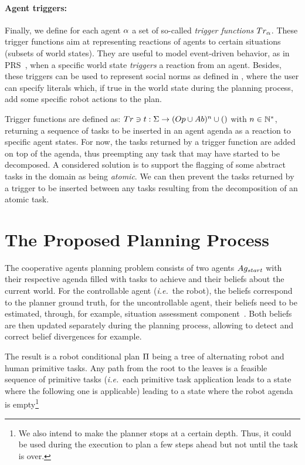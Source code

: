 \documentclass[a4paper,11pt,twoside]{StyleThese}
\begin{document}
\paragraph{\bf Agent triggers:}
Finally, we define for each agent $\alpha$ a set of so-called \textit{trigger functions} $Tr_{\alpha}$. These trigger functions aim at representing reactions of agents to certain situations (subsets of world states). They are useful to model event-driven behavior, as in PRS~\cite{ingrand1996prs}, when a specific world state \textit{triggers} a reaction from an agent. Besides, these triggers can be used to represent social norms as defined in \cite{carlucci2015explicit}, where the user can specify literals which, if true in the world state during the planning process, add some specific robot actions to the plan.

Trigger functions are defined as: $Tr \ni t: \Sigma \rightarrow (Op \cup Ab)^n \cup ()$ with $n \in \mathbb{N}^*$, returning a sequence of tasks to be inserted in an agent agenda as a reaction to specific agent states. For now, the tasks returned by a trigger function are added on top of the agenda, thus preempting any task that may have started to be decomposed. A considered solution is to support the flagging of some abstract tasks in the domain as being \textit{atomic}. We can then prevent the tasks returned by a trigger to be inserted between any tasks resulting from the decomposition of an atomic task.

\section{The Proposed Planning Process}
The cooperative agents planning problem consists of two agents $Ag_{start}$ with their respective agenda filled with tasks to achieve and their beliefs about the current world. For the controllable agent (\textit{i.e.}~the robot), the beliefs correspond to the planner ground truth, for the uncontrollable agent, their beliefs need to be estimated, through, for example, situation assessment component~\cite{milliez2014framework, lemaignan2018underworlds}. Both beliefs are then updated separately during the planning process, allowing to detect and correct belief divergences for example. 

The result is a robot conditional plan $\Pi$ being a tree of alternating robot and human primitive tasks. Any path from the root to the leaves is a feasible sequence of primitive tasks (\textit{i.e.}~each primitive task application leads to a state where the following one is applicable) leading to a state where the robot agenda is empty\footnote{We also intend to make the planner stops at a certain depth. Thus, it could be used during the execution to plan a few steps ahead but not until the task is over.}
\end{document}
